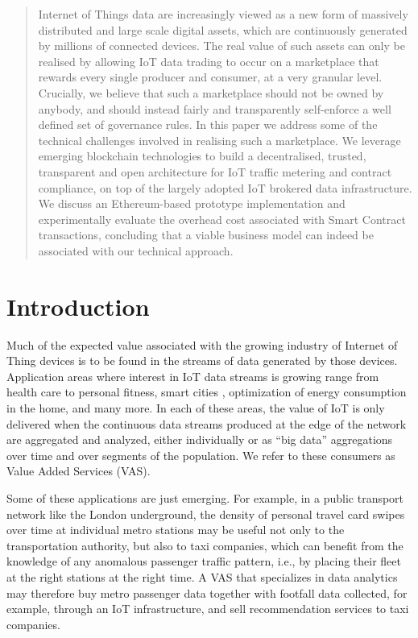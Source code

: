 \documentclass[chi_draft]{sigchi}
\begin{document}
\begin{abstract}
Internet of Things data are increasingly viewed as a new form of massively distributed and large scale digital assets, which are continuously generated by millions of connected devices.
The real value of such assets can only be realised by allowing IoT data trading to occur on a marketplace that rewards every single producer and consumer, at a very granular level.
Crucially, we believe that such a marketplace should not be owned by anybody, and should instead fairly and transparently self-enforce a well defined set of governance rules.
In this paper we address some of the technical challenges involved in realising such a marketplace.
We leverage emerging blockchain technologies to build a decentralised, trusted, transparent and open architecture for IoT traffic metering and contract compliance, on top of the largely adopted IoT brokered data infrastructure.
We discuss an Ethereum-based prototype implementation and experimentally evaluate the overhead cost associated with Smart Contract transactions, concluding that a viable business model can indeed be associated with our technical approach.
\end{abstract}

\section{Introduction}
Much of the expected value associated with the growing industry of Internet of Thing devices \cite{7004800} is to be found in the streams of data generated by those devices.
Application areas where interest in IoT data streams is growing range from health care \cite{7113786} to personal fitness, smart cities \cite{Perera2014}, optimization of energy consumption in the home, and many more.
In each of these areas, the value of IoT is only delivered when the continuous data streams produced at the edge of the network are aggregated and analyzed, either individually or as ``big data'' aggregations over time and over segments of the population.  We refer to these consumers as Value Added Services (VAS).

Some of these applications are just emerging.
For example, in a public transport network like the London underground, the density of personal travel card swipes over time at individual metro stations may be
useful not only to the transportation authority, but also to taxi companies, which can benefit from the knowledge of any anomalous passenger traffic pattern, i.e., by placing their fleet at the right stations at the right time. A VAS that specializes in data analytics may therefore buy metro passenger data together with footfall data collected, for example, through an IoT infrastructure, and sell
recommendation services to taxi companies.
\end{document}
